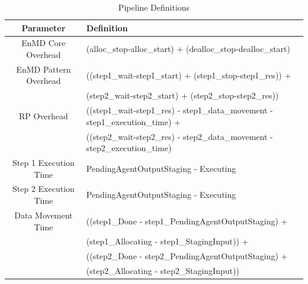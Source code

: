 \documentclass[]{article}
\begin{document}
		\begin{table}[H]
		\centering
			\begin{tabular}{|c|p{10cm}|}
				\hline
				Parameter & Definition  \\
				\hline
				EnMD Core Overhead & (alloc\_stop-alloc\_start) +  (dealloc\_stop-dealloc\_start) \\
				\hline
				EnMD Pattern Overhead & ((step1\_wait-step1\_start) + (step1\_stop-step1\_res)) + \\ 
									  &	(step2\_wait-step2\_start) + (step2\_stop-step2\_res)) \\
				\hline
				RP Overhead & ((step1\_wait-step1\_res) - step1\_data\_movement - step1\_execution\_time) + \\
							&	((step2\_wait-step2\_res) - step2\_data\_movement - step2\_execution\_time) \\
				\hline
				Step 1 Execution Time & PendingAgentOutputStaging - Executing \\
				\hline
				Step 2 Execution Time & PendingAgentOutputStaging - Executing \\
				\hline
				Data Movement Time & ((step1\_Done - step1\_PendingAgentOutputStaging) + \\ 
								   &	(step1\_Allocating - step1\_StagingInput)) + \\
								   &	((step2\_Done - step2\_PendingAgentOutputStaging) + \\
								   &	(step2\_Allocating - step2\_StagingInput)) \\
				\hline
			\end{tabular}
			\caption{Pipeline Definitions}
			\label{table:pipeline_definitions}
		\end{table}
\end{document}
